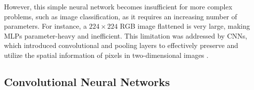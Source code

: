 However, this simple neural network becomes insufficient for more complex problems, such as image classification, as it requires an increasing number of parameters. For instance, a $224\times 224$ RGB image flattened is very large, making MLPs parameter-heavy and inefficient. This limitation was addressed by CNNs, which introduced convolutional and pooling layers to effectively preserve and utilize the spatial information of pixels in two-dimensional images \cite{zhang2023dive}.


\subsection{Convolutional Neural Networks}




 



